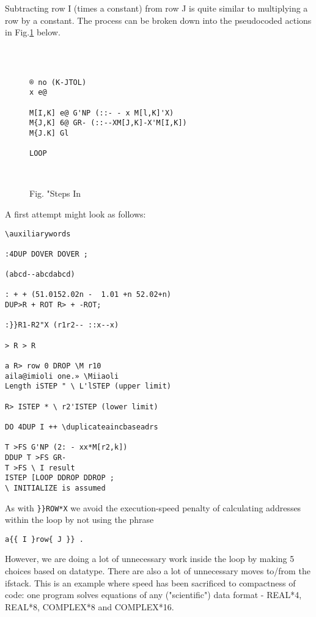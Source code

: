 
Subtracting row I (times a constant) from row J is quite similar to
multiplying a row by a constant. The process can be broken down
into the pseudocoded actions in Fig.\ref{fig:09_03} below.

 
\begin{figure}
\begin{verbatim}

 

® no (K-JTOL)
x e@

M[I,K] e@ G'NP (::- - x M[l,K]'X)
M{J,K] 6@ GR- (::--XM[J,K]-X'M[I,K])
M{J.K] Gl

LOOP

 

\end{verbatim} 
    \caption{Fig. "Steps In }
    \label{fig:09_03}
\end{figure}

A first attempt might look as follows:

\begin{verbatim}
\auxiliarywords

:4DUP DOVER DOVER ;

(abcd--abcdabcd)

: + + (51.0152.02n -  1.01 +n 52.02+n)
DUP>R + ROT R> + -ROT;

:}}R1-R2"X (r1r2-- ::x--x)

> R > R

a R> row 0 DROP \M r10
aila@imioli one.» \Miiaoli
Length iSTEP " \ L'lSTEP (upper limit)

R> ISTEP * \ r2'ISTEP (lower limit)

DO 4DUP I ++ \duplicateaincbaseadrs

T >FS G'NP (2: - xx*M[r2,k])
DDUP T >FS GR-
T >FS \ I result
ISTEP [LOOP DDROP DDROP ;
\ INITIALIZE is assumed

\end{verbatim} 
As with \verb|}}ROW*X| we avoid the execution-speed penalty of
calculating addresses within the loop by not using the phrase
\begin{verbatim}
a{{ I }row{ J }} .
\end{verbatim}
However, we are doing a lot of unnecessary work inside the loop
by making 5 choices based on datatype. There are also a lot of
unnecessary moves to/from the ifstack. This is an example where
speed has been sacrificed to compactness of code: one program
solves equations of any ("scientific") data format - REAL*4,
REAL*8, COMPLEX*8 and COMPLEX*16. 

